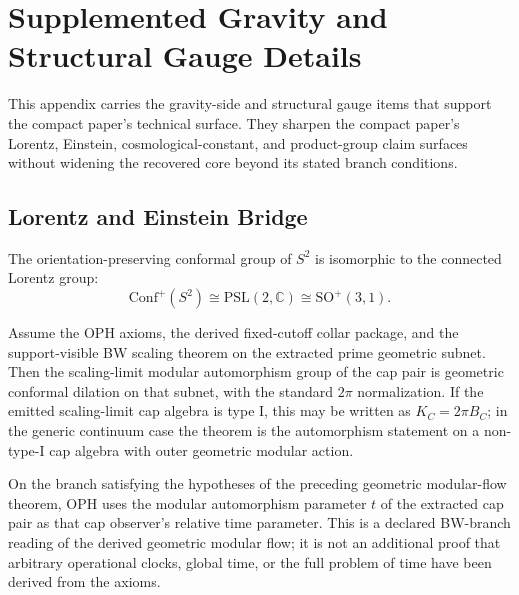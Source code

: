 \section{Supplemented Gravity and Structural Gauge Details}
\label{app:compact-technical-port}

This appendix carries the gravity-side and structural gauge items that support the compact paper's
technical surface. They sharpen the compact paper's Lorentz,
Einstein, cosmological-constant, and product-group claim surfaces without widening the recovered
core beyond its stated branch conditions.

\subsection{Lorentz and Einstein Bridge}

\begin{theorem}
The orientation-preserving conformal group of \(S^2\) is isomorphic to the connected Lorentz
group:
\[
\mathrm{Conf}^+(S^2)\cong \mathrm{PSL}(2,\mathbb C)\cong \mathrm{SO}^+(3,1).
\]
\end{theorem}

\begin{theorem}
Assume the OPH axioms, the derived fixed-cutoff collar package, and the support-visible BW
scaling theorem on the extracted prime geometric subnet. Then the scaling-limit modular
automorphism group of the cap pair is geometric conformal dilation on that
subnet, with the standard \(2\pi\) normalization. If the emitted scaling-limit cap algebra
is type I, this may be written as \(K_C=2\pi B_C\); in the generic continuum case the
theorem is the automorphism statement on a non-type-I cap algebra with outer geometric modular
action.
\end{theorem}

\begin{definition}
On the branch satisfying the hypotheses of the preceding geometric modular-flow theorem, OPH uses
the modular automorphism parameter \(t\) of the extracted cap pair as that cap observer's relative
time parameter. This is a declared BW-branch reading of the derived geometric modular flow; it is
not an additional proof that arbitrary operational clocks, global time, or the full problem of time
have been derived from the axioms.
\end{definition}

